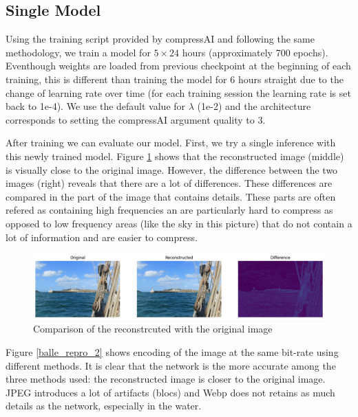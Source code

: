 \subsection{Single Model}
Using the training script provided by compressAI and following the same methodology, we train a model for \(5 \times 24\) hours (approximately 700 epochs). Eventhough weights are loaded from previous checkpoint at the beginning of each training, this is different than training the model for 6 hours straight due to the change of learning rate over time (for each training session the learning rate is set back to 1e-4). We use the default value for \(\lambda\) (1e-2) and the architecture corresponds to setting the compressAI argument \textsf{quality} to 3.

After training we can evaluate our model. First, we try a single inference with this newly trained model. Figure \ref{balle_repro_1} shows that the reconstructed image (middle) is visually close to the original image. However, the difference between the two images (right) reveals that there are a lot of differences. These differences are compared in the part of the image that contains details. These parts are often refered as containing high frequencies an are particularly hard to compress as opposed to low frequency areas (like the sky in this picture) that do not contain a lot of information and are easier to compress.

\begin{figure}
    \centering
    \includegraphics[width=15cm]{img/balle_repro_1.png}
    \caption{Comparison of the reconstrcuted with the original image}
    \label{balle_repro_1}
\end{figure}

Figure \ref{balle_repro_2} shows encoding of the image at the same bit-rate using different methods. It is clear that the network is the more accurate among the three methods used: the reconstructed image is closer to the original image. JPEG introduces a lot of artifacts (blocs) and Webp does not retains as much details as the network, especially in the water.

